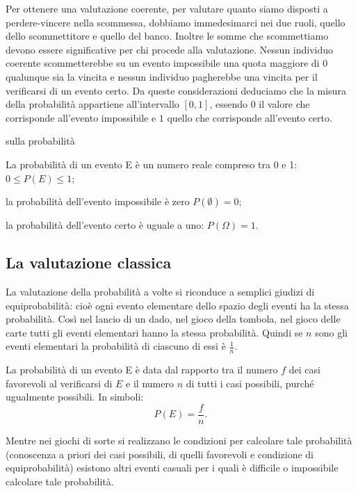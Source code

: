 Per ottenere una valutazione coerente, per valutare quanto siamo disposti a perdere-vincere nella scommessa, dobbiamo immedesimarci nei due ruoli, quello dello scommettitore e quello del banco. Inoltre le somme che scommettiamo devono essere significative per chi procede alla valutazione.
Nessun individuo coerente scommetterebbe su un evento impossibile una quota maggiore di 0 qualunque sia la vincita e nessun individuo pagherebbe una vincita per il verificarsi di un evento certo.
Da queste considerazioni deduciamo che la misura della probabilità appartiene all'intervallo $[0,1]$, essendo $ 0 $ il valore che corrisponde all'evento impossibile e $1$ quello che corrisponde all'evento certo.

\begin{postulato}{sulla probabilità}

La probabilità di un evento E è un numero reale compreso tra 0 e 1: $0\le P(E)\le 1$;

la probabilità dell'evento impossibile è zero $P(\emptyset )=0$;

la probabilità dell'evento certo è uguale a uno: $P(\Omega )=1$.
\end{postulato}



\subsection{La valutazione classica}
La valutazione della probabilità a volte si riconduce a semplici giudizi di equiprobabilità: cioè ogni evento elementare dello spazio degli eventi ha la stessa probabilità. Così nel lancio di un dado, nel gioco della tombola, nel gioco delle carte tutti gli eventi elementari hanno la stessa probabilità. Quindi se $n$ sono gli eventi elementari la probabilità di ciascuno di essi è $\frac 1 n$.

La probabilità di un evento E è data dal rapporto tra il numero $f$ dei casi favorevoli al verificarsi di $E$ e il numero $n$ di tutti i casi possibili, purché ugualmente possibili. In simboli: \[ P(E)=\dfrac f n. \]

Mentre nei giochi di sorte si realizzano le condizioni per calcolare tale probabilità (conoscenza a priori dei casi possibili, di quelli favorevoli e condizione di equiprobabilità) esistono altri eventi casuali per i quali è difficile o impossibile calcolare tale probabilità.

